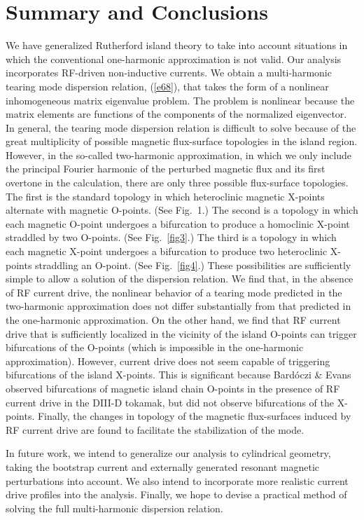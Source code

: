\documentclass[12pt,prb,aps]{revtex4-1}
\begin{document}
\section{Summary and Conclusions}
We have generalized Rutherford island theory to take into account situations in which the conventional one-harmonic
approximation is not valid. Our analysis incorporates RF-driven non-inductive currents. We obtain a
multi-harmonic tearing mode dispersion relation, (\ref{e68}), that takes the form of a nonlinear inhomogeneous matrix
eigenvalue problem. The problem is nonlinear because the matrix elements are functions of the components of the normalized eigenvector. In general, the tearing mode dispersion relation  is difficult to solve because of the great multiplicity of
possible magnetic flux-surface topologies in the island region. However, in the so-called two-harmonic approximation,
in which we only include the principal Fourier harmonic of the perturbed magnetic flux and its first overtone in the calculation, there are
only three possible flux-surface topologies. The first is the standard topology in which heteroclinic magnetic X-points
alternate with magnetic O-points. (See Fig.~1.)  The second is a topology in which each magnetic O-point undergoes a
 bifurcation to produce a  homoclinic X-point straddled by two O-points. (See Fig.~\ref{fig3}.) The third
is a topology in which each magnetic X-point undergoes a bifurcation to produce two
heteroclinic X-points straddling an O-point. (See Fig.~\ref{fig4}.)  These possibilities are sufficiently simple to allow a solution of the dispersion relation. 
We find that, in the absence of RF current drive, the nonlinear behavior of a tearing
mode predicted in the two-harmonic approximation does not differ substantially from that predicted in the
 one-harmonic approximation. On the other hand, we find that RF current drive that is sufficiently localized in the
vicinity of the island O-points can trigger bifurcations of the O-points (which is impossible in the one-harmonic approximation). However, current
drive does not seem capable of triggering  bifurcations of the island X-points. This is significant because
 Bard\'{o}czi \& Evans observed  bifurcations of magnetic island chain O-points in the presence of RF
 current drive in the DIII-D tokamak,\cite{bar}  but did not observe  bifurcations of the X-points. Finally, the changes in topology of the magnetic
 flux-surfaces induced by RF current drive are found to facilitate the stabilization of the mode. 
 
In future work, we intend to generalize our analysis to cylindrical geometry, taking the bootstrap current and externally
generated resonant magnetic perturbations into account. We also intend to incorporate more realistic current drive
profiles into the analysis. Finally, we hope to devise a practical method of solving the full multi-harmonic dispersion
relation. 
\end{document}
